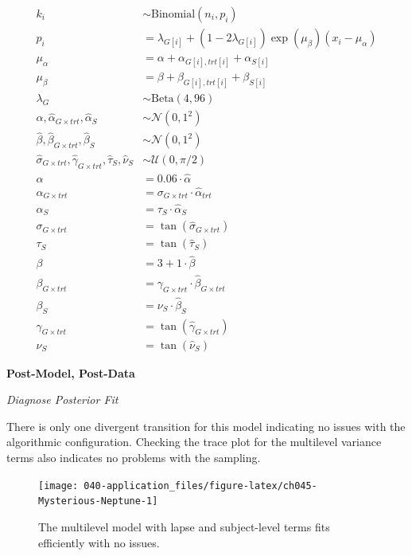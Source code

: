\documentclass[11pt, oneside, openany]{scrbook}
\begin{document}
\begin{equation}
\begin{split}
k_i &\sim \mathrm{Binomial}(n_i, p_i) \\
p_i &= \lambda_{G[i]} + (1 - 2\lambda_{G[i]})\exp(\mu_\beta) (x_i - \mu_\alpha) \\
\mu_\alpha &= \alpha + \alpha_{G[i], trt[i]} + \alpha_{S[i]} \\
\mu_\beta &= \beta + \beta_{G[i], trt[i]} + \beta_{S[i]} \\
\lambda_{G} &\sim \mathrm{Beta}(4, 96) \\
\hat{\alpha}, \hat{\alpha}_{G\times trt}, \hat{\alpha}_{S} &\sim \mathcal{N}(0, 1^2) \\
\hat{\beta}, \hat{\beta}_{G\times trt}, \hat{\beta}_{S} &\sim \mathcal{N}(0, 1^2) \\
\hat{\sigma}_{G\times trt}, \hat{\gamma}_{G\times trt}, \hat{\tau}_{S}, \hat{\nu}_{S} &\sim \mathcal{U}(0, \pi/2) \\
\alpha &= 0.06 \cdot \hat{\alpha} \\
\alpha_{G\times trt} &= \sigma_{G\times trt} \cdot \hat{\alpha}_{trt} \\
\alpha_{S} &= \tau_{S} \cdot \hat{\alpha}_{S} \\
\sigma_{G \times trt} &= \tan(\hat{\sigma}_{G \times trt}) \\
\tau_{S} &= \tan(\hat{\tau}_{S}) \\
\beta &= 3 + 1 \cdot \hat{\beta} \\
\beta_{G\times trt} &= \gamma_{G\times trt} \cdot \hat{\beta}_{G\times trt} \\
\beta_{S} &= \nu_{S} \cdot \hat{\beta}_{S} \\
\gamma_{G\times trt} &= \tan(\hat{\gamma}_{G\times trt}) \\
\nu_{S} &= \tan(\hat{\nu}_{S})
\end{split}
\label{eq:iter5-model}
\end{equation}

\textbf{Post-Model, Post-Data}

\emph{Diagnose Posterior Fit}

There is only one divergent transition for this model indicating no issues with the algorithmic configuration. Checking the trace plot for the multilevel variance terms also indicates no problems with the sampling.

\begin{figure}

{\centering \texttt{[image: 040-application\_files/figure-latex/ch045-Mysterious-Neptune-1]} 

}

\caption{The multilevel model with lapse and subject-level terms fits efficiently with no issues.}\label{fig:ch045-Mysterious-Neptune}
\end{figure}
\end{document}
